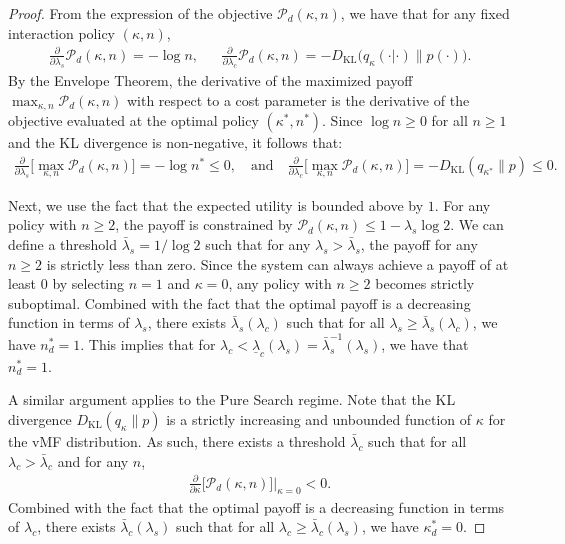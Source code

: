\documentclass[12pt]{article}
\theoremstyle{definition}
\theoremstyle{remark}
\begin{document}
\begin{proof}
From the expression of the objective $\mathcal{P}_d(\kappa,n)$, we have that for any fixed interaction policy $(\kappa, n)$,
\begin{align*}
    \frac{\partial}{\partial \lambda_s} \mathcal{P}_d(\kappa,n) = - \log n, && \frac{\partial}{\partial \lambda_c} \mathcal{P}_d(\kappa,n) = - D_{\text{KL}}\big(q_{\kappa}(\cdot|\cdot) \| p(\cdot)\big).
\end{align*}
By the Envelope Theorem, the derivative of the maximized payoff $ \max_{\kappa, n} \mathcal{P}_d(\kappa, n)$ with respect to a cost parameter is the derivative of the objective evaluated at the optimal policy $(\kappa^*, n^*)$. Since $\log n \geq 0$ for all $n \geq 1$ and the KL divergence is non-negative, it follows that:
\begin{align*}
\frac{\partial}{\partial \lambda_s} \Big[\max_{\kappa, n} \mathcal{P}_d(\kappa, n)\Big] = -\log n^* \leq 0, \quad \text{and} \quad \frac{\partial }{\partial \lambda_c} \Big[\max_{\kappa, n} \mathcal{P}_d(\kappa, n)\Big] = -D_{\text{KL}}(q_{\kappa^*} \| p) \leq 0.
\end{align*}

Next, we use the fact that the expected utility is bounded above by $1$. For any policy with $n \geq 2$, the payoff is constrained by $\mathcal{P}_d(\kappa, n) \leq 1 - \lambda_s \log 2$. We can define a threshold $\bar{\lambda}_s = 1/\log 2$ such that for any $\lambda_s > \bar{\lambda}_s$, the payoff for any $n \geq 2$ is strictly less than zero. Since the system can always achieve a payoff of at least $0$ by selecting $n=1$ and $\kappa=0$, any policy with $n \geq 2$ becomes strictly suboptimal. Combined with the fact that the optimal payoff is a decreasing function in terms of $\lambda_s$, there exists $\bar\lambda_s(\lambda_c)$ such that for all $\lambda_s \geq \bar\lambda_s(\lambda_c)$, we have $n^*_d = 1$. This implies that for $\lambda_c < \underline \lambda_c(\lambda_s) = \bar \lambda_s^{-1}(\lambda_s)$, we have that $n^*_d = 1$.

A similar argument applies to the Pure Search regime. Note that the KL divergence $D_{\text{KL}}(q_{\kappa} \| p)$ is a strictly increasing and unbounded function of $\kappa$ for the vMF distribution. As such, there exists a threshold $\bar{\lambda}_c$ such that for all $\lambda_c > \bar{\lambda}_c$ and for any $n$,
\begin{align*}
    \frac{\partial}{\partial \kappa} \Big[\mathcal{P}_d(\kappa, n)\Big] \Bigg|_{\kappa = 0} < 0.
\end{align*}
Combined with the fact that the optimal payoff is a decreasing function in terms of $\lambda_c$, there exists $\bar\lambda_c(\lambda_s)$ such that for all $\lambda_c \geq \bar\lambda_c(\lambda_s)$, we have $\kappa^*_d = 0$.
\end{proof}
\end{document}
